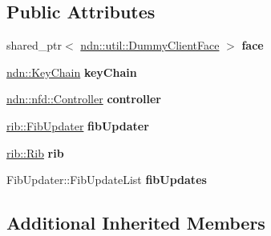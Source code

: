 \subsection*{Public Attributes}
\begin{DoxyCompactItemize}
\item 
shared\+\_\+ptr$<$ \hyperlink{classndn_1_1util_1_1DummyClientFace}{ndn\+::util\+::\+Dummy\+Client\+Face} $>$ {\bfseries face}\hypertarget{classnfd_1_1rib_1_1tests_1_1FibUpdatesFixture_a3ce88e9de31db50bc6a271ea38f6a142}{}\label{classnfd_1_1rib_1_1tests_1_1FibUpdatesFixture_a3ce88e9de31db50bc6a271ea38f6a142}

\item 
\hyperlink{classndn_1_1security_1_1KeyChain}{ndn\+::\+Key\+Chain} {\bfseries key\+Chain}\hypertarget{classnfd_1_1rib_1_1tests_1_1FibUpdatesFixture_a6510994abf441349d8260fd70a0f4710}{}\label{classnfd_1_1rib_1_1tests_1_1FibUpdatesFixture_a6510994abf441349d8260fd70a0f4710}

\item 
\hyperlink{classndn_1_1nfd_1_1Controller}{ndn\+::nfd\+::\+Controller} {\bfseries controller}\hypertarget{classnfd_1_1rib_1_1tests_1_1FibUpdatesFixture_a4bd09c9494f9c264f9fe3638b219c6be}{}\label{classnfd_1_1rib_1_1tests_1_1FibUpdatesFixture_a4bd09c9494f9c264f9fe3638b219c6be}

\item 
\hyperlink{classnfd_1_1rib_1_1FibUpdater}{rib\+::\+Fib\+Updater} {\bfseries fib\+Updater}\hypertarget{classnfd_1_1rib_1_1tests_1_1FibUpdatesFixture_a9387485891bca80fbeb8d4fcefda3a3f}{}\label{classnfd_1_1rib_1_1tests_1_1FibUpdatesFixture_a9387485891bca80fbeb8d4fcefda3a3f}

\item 
\hyperlink{classnfd_1_1rib_1_1Rib}{rib\+::\+Rib} {\bfseries rib}\hypertarget{classnfd_1_1rib_1_1tests_1_1FibUpdatesFixture_ac702e7a86296b4c045475f3cfe03be41}{}\label{classnfd_1_1rib_1_1tests_1_1FibUpdatesFixture_ac702e7a86296b4c045475f3cfe03be41}

\item 
Fib\+Updater\+::\+Fib\+Update\+List {\bfseries fib\+Updates}\hypertarget{classnfd_1_1rib_1_1tests_1_1FibUpdatesFixture_afaa1240afc94eb8ede522e672474bada}{}\label{classnfd_1_1rib_1_1tests_1_1FibUpdatesFixture_afaa1240afc94eb8ede522e672474bada}

\end{DoxyCompactItemize}
\subsection*{Additional Inherited Members}


